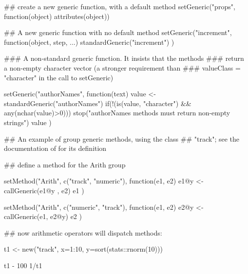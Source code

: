 \begin{Examples}
\begin{ExampleCode}


## create a new generic function, with a default method
setGeneric("props", function(object) attributes(object))

## A new generic function with no default method
setGeneric("increment",
  function(object, step, ...)
    standardGeneric("increment")
)


###   A non-standard generic function.  It insists that the methods
###   return a non-empty character vector (a stronger requirement than
###    valueClass = "character" in the call to setGeneric)

setGeneric("authorNames",
    function(text) {
      value <- standardGeneric("authorNames")
      if(!(is(value, "character") && any(nchar(value)>0)))
        stop("authorNames methods must return non-empty strings")
      value
      })



## An example of group generic methods, using the class
## "track"; see the documentation of  for its definition

## define a method for the Arith group

setMethod("Arith", c("track", "numeric"),
 function(e1, e2) {
  e1@y <- callGeneric(e1@y , e2)
  e1
})

setMethod("Arith", c("numeric", "track"),
 function(e1, e2) {
  e2@y <- callGeneric(e1, e2@y)
  e2
})

## now arithmetic operators  will dispatch methods:

t1 <- new("track", x=1:10, y=sort(stats::rnorm(10)))

t1 - 100
1/t1


\end{ExampleCode}
\end{Examples}
%
